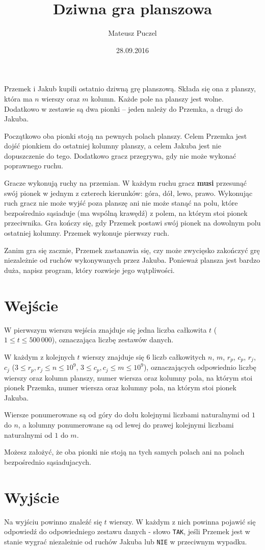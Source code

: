 \documentclass[zad,zawodnik,utf8]{sinol}
\title{Dziwna gra planszowa}
\author{Mateusz Puczel} %
\date{28.09.2016}
\begin{document}
\begin{tasktext}%
Przemek i Jakub kupili ostatnio dziwną grę planszową. Składa się ona z planszy, która ma $n$ wierszy oraz $m$ kolumn.
Każde pole na planszy jest wolne. Dodatkowo w zestawie są dwa pionki -- jeden należy do Przemka, a drugi do Jakuba.

Początkowo oba pionki stoją na pewnych polach planszy. Celem Przemka jest dojść pionkiem do ostatniej kolumny planszy,
a celem Jakuba jest nie dopuszczenie do tego. Dodatkowo gracz przegrywa, gdy nie może wykonać poprawnego ruchu.

Gracze wykonują ruchy na przemian. W każdym ruchu
gracz \textbf{musi} przesunąć swój pionek w jednym z czterech kierunków: góra, dół, lewo, prawo. Wykonując ruch gracz nie może
wyjść poza planszę ani nie może stanąć na polu, które bezpośrednio sąsiaduje (ma wspólną krawędź) z polem, na którym stoi pionek przeciwnika.
Gra kończy się, gdy Przemek postawi swój pionek na dowolnym polu ostatniej kolumny.
Przemek wykonuje pierwszy ruch.

Zanim gra się zacznie, Przemek zastanawia się, czy może zwycięsko zakończyć grę niezależnie od ruchów wykonywanych przez Jakuba.
Ponieważ plansza jest bardzo duża, napisz program, który rozwieje jego wątpliwości.

  \section{Wejście}
W pierwszym wierszu wejścia znajduje się jedna liczba całkowita $t$ ($1 \leq t \leq 500\,000$), oznaczająca liczbę zestawów danych.

W każdym z kolejnych $t$ wierszy znajduje się 6 liczb całkowitych $n$, $m$, $r_p$, $c_p$, $r_j$, $c_j$ 
($3 \leq r_p, r_j \leq n \leq 10^9$, $3 \leq c_p, c_j \leq m \leq 10^9$), oznaczających odpowiednio liczbę wierszy oraz kolumn planszy,
numer wiersza oraz kolumny pola, na którym stoi pionek Przemka, numer wiersza oraz kolumny pola,
na którym stoi pionek Jakuba.

Wiersze ponumerowane są od góry do dołu kolejnymi liczbami naturalnymi od $1$ do $n$, a kolumny ponumerowane
są od lewej do prawej kolejnymi liczbami naturalnymi od $1$ do $m$.

Możesz założyć, że oba pionki nie stoją na tych samych polach ani na polach bezpośrednio sąsiadujacych.
  \section{Wyjście}
Na wyjściu powinno znaleźć się $t$ wierszy. W każdym z nich powinna pojawić się odpowiedź do odpowiedniego zestawu danych - 
słowo \texttt{TAK}, jeśli Przemek jest w stanie wygrać niezależnie od ruchów Jakuba lub \texttt{NIE} w przeciwnym wypadku.


\end{tasktext}
\end{document}
